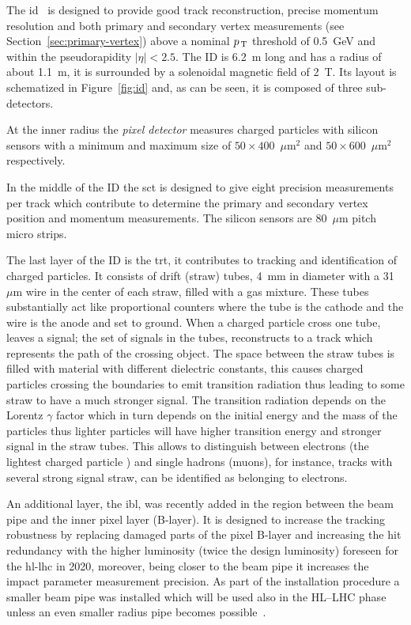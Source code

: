 The \gls{id}~\cite{ATLASPaper} is designed to provide good track reconstruction,
precise momentum resolution and both primary and secondary vertex measurements
(see Section~\ref{sec:primary-vertex}) above a nominal $p_\mathrm{\, T}$ threshold of
0.5~GeV and within the pseudorapidity $|\eta| < 2.5$. The ID is 6.2~m long and
has a radius of about 1.1~m, it is surrounded by a solenoidal magnetic field of
2~T. Its layout is schematized in Figure~\ref{fig:id} and, as can be seen, it is
composed of three sub-detectors.

At the inner radius the \emph{pixel detector} measures charged particles with
silicon sensors with a minimum and maximum size of $50 \times 400$~$\mu$m$^2$
and $50 \times 600$~$\mu$m$^2$ respectively.

In the middle of the ID the \gls{sct} is designed to give eight precision
measurements per track which contribute to determine the primary and secondary
vertex position and momentum measurements. The silicon sensors are 80~$\mu$m
pitch micro strips.

The last layer of the ID is the \gls{trt}, it contributes to tracking and
identification of charged particles. It consists of drift (straw) tubes, 4~mm in
diameter with a 31~$\mu$m wire in the center of each straw, filled with a gas
mixture. These tubes substantially act like proportional counters where the tube
is the cathode and the wire is the anode and set to ground. When a charged
particle cross one tube, leaves a signal; the set of signals in the tubes,
reconstructs to a track which represents the path of the crossing object. The
space between the straw tubes is filled with material with different dielectric
constants, this causes charged particles crossing the boundaries to emit
transition radiation thus leading to some straw to have a much stronger
signal. The transition radiation depends on the Lorentz $\gamma$ factor which in
turn depends on the initial energy and the mass of the particles thus lighter
particles will have higher transition energy and stronger signal in the straw
tubes. This allows to distinguish between electrons (the lightest charged
particle ) and single hadrons (muons), for instance, tracks with several strong
signal straw, can be identified as belonging to electrons.

An additional layer, the \gls{ibl}, was recently added in the region between the
beam pipe and the inner pixel layer (B-layer). It is designed to increase the
tracking robustness by replacing damaged parts of the pixel B-layer and
increasing the hit redundancy with the higher luminosity (twice the design
luminosity) foreseen for the \gls{hl-lhc} in 2020, moreover, being closer to the
beam pipe it increases the impact parameter measurement precision. As part of
the installation procedure a smaller beam pipe was installed which will be used
also in the HL--LHC phase unless an even smaller radius pipe becomes
possible~\cite{IBL}.

